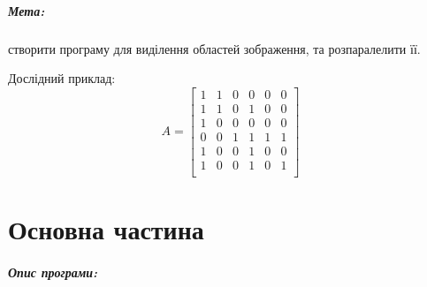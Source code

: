 \documentclass{udstu}
\begin{document}

\tableofcontents

\intro

\paragraph{\textbf{Мета:}} створити програму для виділення областей зображення, та розпаралелити її.

Дослідний приклад:
\begin{equation*}
	A = \begin{bmatrix}
			1 & 1 & 0 & 0 & 0 & 0 \\
            1 & 1 & 0 & 1 & 0 & 0 \\
            1 & 0 & 0 & 0 & 0 & 0 \\
            0 & 0 & 1 & 1 & 1 & 1 \\
            1 & 0 & 0 & 1 & 0 & 0 \\
            1 & 0 & 0 & 1 & 0 & 1 \\
	    \end{bmatrix}
\end{equation*}


\chapter{Основна частина}
\label{chap:1}

\paragraph{\textbf{Опис програми:}}
\end{document}
